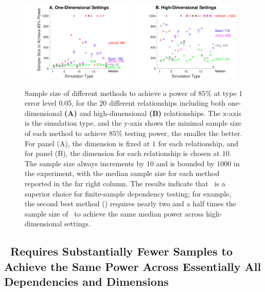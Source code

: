 \documentclass[11pt]{extarticle}
\begin{document}
\begin{figure}[!ht]
\centering
\includegraphics[width=0.48\textwidth,trim={1.5cm 0 0cm 0cm},clip]{Figures/Fig1DPowerSummarySize}
\includegraphics[width=0.48\textwidth,trim={1.5cm 0 0cm 0cm},clip]{Figures/FigHDPowerSummarySize}
  \caption{
Sample size of different methods to achieve a power of $85\%$ at type 1 error level $0.05$, for the $20$ different relationships including both one-dimensional \textbf{(A)} and high-dimensional \textbf{(B)} relationships.
The x-axis is the simulation type, and the y-axis shows the minimal sample size of each method to achieve $85\%$ testing power, the smaller the better.
For panel (A), the dimension is fixed at $1$ for each relationship,
and for panel (B), the dimension for each relationship is chosen at $10$.
The sample size always increments by $10$ and is bounded by $1000$ in the experiment, with the median sample size for each method reported in the far right column. The results indicate that \Mgc~is a superior choice for finite-sample dependency testing; for example,  the second best method (\Hhg) requires nearly two and a half times the sample size of \Mgc~to achieve the same median power across high-dimensional settings.}
\label{f:Summary}
\end{figure}

\subsection*{\Mgc~Requires Substantially Fewer Samples to Achieve the Same Power Across Essentially All Dependencies and Dimensions}
\end{document}
